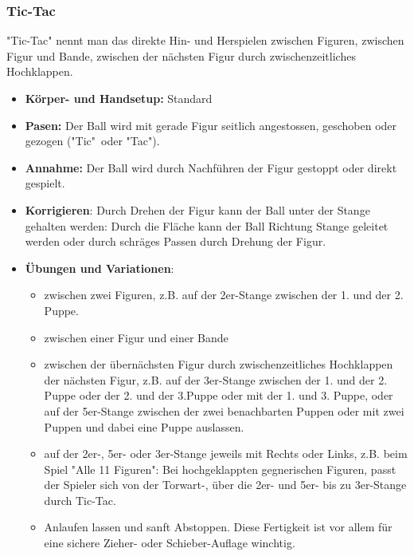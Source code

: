 \subsubsection{Tic-Tac}
"Tic-Tac" nennt man das direkte Hin- und Herspielen zwischen Figuren, zwischen Figur und Bande, zwischen der nächsten Figur durch zwischenzeitliches Hochklappen. 
\begin{itemize}
    \item \textbf{Körper- und Handsetup:} Standard 
    \item \textbf{Pasen:} Der Ball wird mit gerade Figur seitlich angestossen, geschoben oder gezogen ("Tic"\ oder "Tac").
    \item \textbf{Annahme:} Der Ball wird durch Nachführen der Figur gestoppt oder direkt gespielt.
    \item \textbf{Korrigieren}: Durch Drehen der Figur kann der Ball unter der Stange gehalten werden: Durch die Fläche kann der Ball Richtung Stange geleitet werden oder durch schräges Passen durch Drehung der Figur.  
    \item \textbf{Übungen und Variationen}:
        \begin{itemize}
            \item zwischen zwei Figuren, z.B. auf der 2er-Stange zwischen der 1. und der 2. Puppe.
            \item zwischen einer Figur und einer Bande
            \item zwischen der übernächsten Figur durch zwischenzeitliches Hochklappen der nächsten Figur, z.B. auf der 3er-Stange zwischen der 1. und der 2. Puppe oder der 2. und der 3.Puppe oder mit der 1. und 3. Puppe, oder auf der 5er-Stange zwischen der zwei benachbarten Puppen oder mit zwei Puppen und dabei eine Puppe auslassen.
            \item auf der 2er-, 5er- oder 3er-Stange jeweils mit Rechts oder Links, z.B. beim Spiel "Alle 11 Figuren": Bei hochgeklappten gegnerischen Figuren, passt der Spieler sich von der Torwart-, über die 2er- und 5er- bis zu 3er-Stange durch Tic-Tac. 
            \item Anlaufen lassen und sanft Abstoppen. Diese Fertigkeit ist vor allem für eine sichere Zieher- oder Schieber-Auflage winchtig.
        \end{itemize}
\end{itemize}


